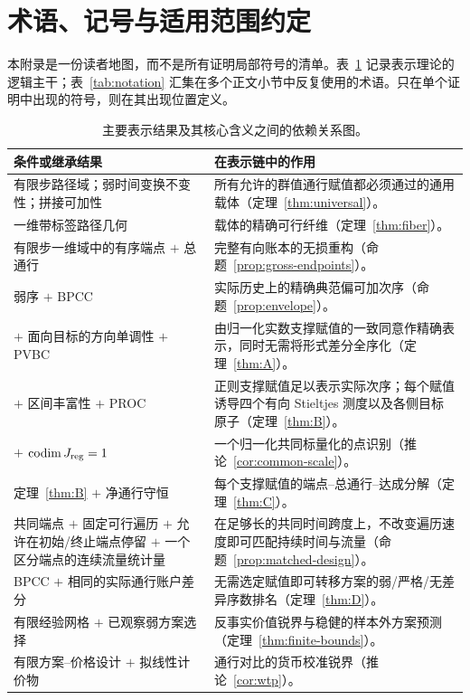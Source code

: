 \section{术语、记号与适用范围约定}\label{app:notation}

本附录是一份读者地图，而不是所有证明局部符号的清单。表~\ref{tab:dependency} 记录表示理论的逻辑主干；表~\ref{tab:notation} 汇集在多个正文小节中反复使用的术语。只在单个证明中出现的符号，则在其出现位置定义。

\begin{table}[ht]
\centering
\small
\renewcommand{\arraystretch}{1.16}
\begin{tabularx}{\textwidth}{@{}>{\raggedright\arraybackslash}p{}>{\raggedright\arraybackslash}X@{}}
\toprule
条件或继承结果 & 在表示链中的作用\\
\midrule
有限步路径域；弱时间变换不变性；拼接可加性 & 所有允许的群值通行赋值都必须通过的通用载体（定理~\ref{thm:universal}）。\\
一维带标签路径几何 & 载体的精确可行纤维（定理~\ref{thm:fiber}）。\\
有限步一维域中的有序端点 $+$ 总通行 & 完整有向账本的无损重构（命题~\ref{prop:gross-endpoints}）。\\
弱序 $+$ BPCC & 实际历史上的精确典范偏可加次序（命题~\ref{prop:envelope}）。\\
$+$ 面向目标的方向单调性 $+$ PVBC & 由归一化实数支撑赋值的一致同意作精确表示，同时无需将形式差分全序化（定理~\ref{thm:A}）。\\
$+$ 区间丰富性 $+$ PROC & 正则支撑赋值足以表示实际次序；每个赋值诱导四个有向 Stieltjes 测度以及各侧目标原子（定理~\ref{thm:B}）。\\
$+$ $\operatorname{codim} J_{\mathrm{reg}}=1$ & 一个归一化共同标量化的点识别（推论~\ref{cor:common-scale}）。\\
定理~\ref{thm:B} $+$ 净通行守恒 & 每个支撑赋值的端点--总通行--达成分解（定理~\ref{thm:C}）。\\
共同端点 $+$ 固定可行遍历 $+$ 允许在初始/终止端点停留 $+$ 一个区分端点的连续流量统计量 & 在足够长的共同时间跨度上，不改变遍历速度即可匹配持续时间与流量（命题~\ref{prop:matched-design}）。\\
BPCC $+$ 相同的实际通行账户差分 & 无需选定赋值即可转移方案的弱/严格/无差异序数排名（定理~\ref{thm:D}）。\\
有限经验网格 $+$ 已观察弱方案选择 & 反事实价值锐界与稳健的样本外方案预测（定理~\ref{thm:finite-bounds}）。\\
有限方案--价格设计 $+$ 拟线性计价物 & 通行对比的货币校准锐界（推论~\ref{cor:wtp}）。\\
\bottomrule
\end{tabularx}
\caption{主要表示结果及其核心含义之间的依赖关系图。}
\label{tab:dependency}
\end{table}


